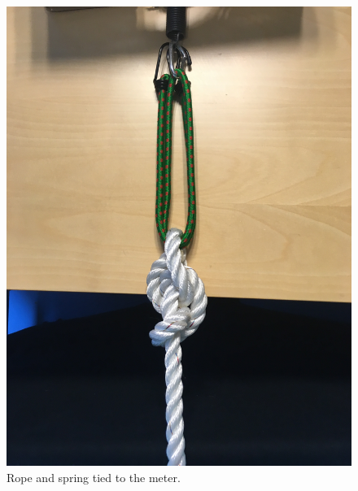 \begin{figure}
  \centering
  \captionsetup{justification=centering,margin=0.1cm}
\hspace*{\fill}
  \begin{minipage}[b]{0.4\textwidth}
    \includegraphics[width=\textwidth]{Images/rope.JPG}
    \caption{Rope and spring tied to the meter.}
     \label{fig:setupRopeBox1}
    \end{minipage}
  \hfill
  \begin{minipage}[b]{0.4\textwidth}

\end{minipage}
\end{figure}
